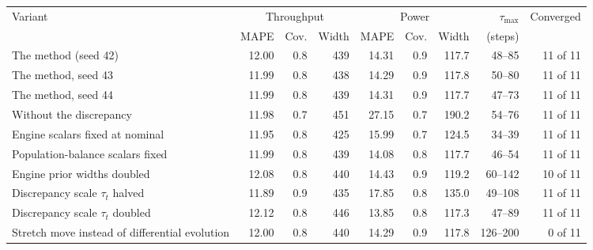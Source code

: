\begin{tabular}{@{}lrrrrrrrr@{}}
\toprule
Variant & \multicolumn{3}{c}{Throughput} & \multicolumn{3}{c}{Power} & $\tau_{\max}$ & Converged \\
 & MAPE & Cov. & Width & MAPE & Cov. & Width & (steps) & \\
\midrule
The method (seed 42) & 12.00 & 0.8 & 439 & 14.31 & 0.9 & 117.7 & 48--85 & 11 of 11 \\
The method, seed 43 & 11.99 & 0.8 & 438 & 14.29 & 0.9 & 117.8 & 50--80 & 11 of 11 \\
The method, seed 44 & 11.99 & 0.8 & 439 & 14.31 & 0.9 & 117.7 & 47--73 & 11 of 11 \\
\midrule
Without the discrepancy & 11.98 & 0.7 & 451 & 27.15 & 0.7 & 190.2 & 54--76 & 11 of 11 \\
Engine scalars fixed at nominal & 11.95 & 0.8 & 425 & 15.99 & 0.7 & 124.5 & 34--39 & 11 of 11 \\
Population-balance scalars fixed & 11.99 & 0.8 & 439 & 14.08 & 0.8 & 117.7 & 46--54 & 11 of 11 \\
Engine prior widths doubled & 12.08 & 0.8 & 440 & 14.43 & 0.9 & 119.2 & 60--142 & 10 of 11 \\
Discrepancy scale $\tau_t$ halved & 11.89 & 0.9 & 435 & 17.85 & 0.8 & 135.0 & 49--108 & 11 of 11 \\
Discrepancy scale $\tau_t$ doubled & 12.12 & 0.8 & 446 & 13.85 & 0.8 & 117.3 & 47--89 & 11 of 11 \\
Stretch move instead of differential evolution & 12.00 & 0.8 & 440 & 14.29 & 0.9 & 117.8 & 126--200 & 0 of 11 \\
\bottomrule
\end{tabular}
